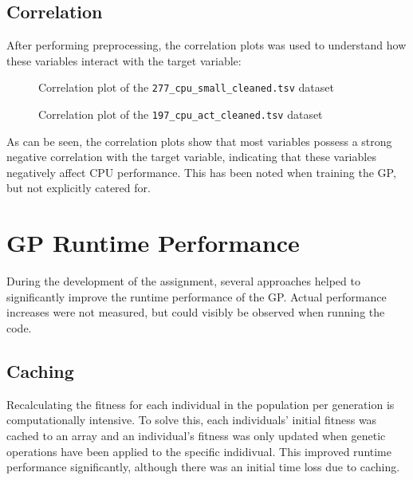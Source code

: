 \documentclass{article}
\begin{document}
\subsection{Correlation}
After performing preprocessing, the correlation plots was used to understand how these variables interact with the target variable:

\begin{figure}[H]
  \caption{Correlation plot of the \texttt{277\_cpu\_small\_cleaned.tsv} dataset}
\end{figure}

\begin{figure}[H]
  \caption{Correlation plot of the \texttt{197\_cpu\_act\_cleaned.tsv} dataset}
\end{figure}

As can be seen, the correlation plots show that most variables possess a strong negative correlation with the target variable, indicating that these variables negatively affect CPU performance. This has been noted when training the GP, but not explicitly catered for.


\section{GP Runtime Performance}
During the development of the assignment, several approaches helped to significantly improve the runtime performance of the GP. Actual performance increases were not measured, but could visibly be observed when running the code.
\subsection{Caching}
Recalculating the fitness for each individual in the population per generation is computationally intensive. To solve this, each individuals' initial fitness was cached to an array and an individual's fitness was only updated when genetic operations have been applied to the specific indidivual. This improved runtime performance significantly, although there was an initial time loss due to caching.
\end{document}
